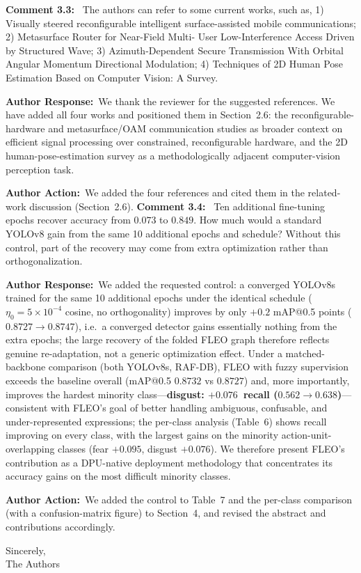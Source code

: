 \documentclass[11pt]{article}
\newcommand{\comment}[1]{\smallskip\noindent\textbf{\color{navy}Comment #1:}\ }
\newcommand{\response}{\smallskip\par\noindent\textbf{\color{steel}Author Response:}\ }
\newcommand{\action}{\smallskip\par\noindent\textbf{\color{steel}Author Action:}\ }
\begin{document}
\comment{3.3} The authors can refer to some current works, such as, 1) Visually steered reconfigurable
intelligent surface-assisted mobile communications; 2) Metasurface Router for Near-Field Multi-
User Low-Interference Access Driven by Structured Wave; 3) Azimuth-Dependent Secure
Transmission With Orbital Angular Momentum Directional Modulation; 4) Techniques of 2D
Human Pose Estimation Based on Computer Vision: A Survey.
\response We thank the reviewer for the suggested references. We have added all four works and
positioned them in Section~2.6: the reconfigurable-hardware and metasurface/OAM communication
studies as broader context on efficient signal processing over constrained, reconfigurable
hardware, and the 2D human-pose-estimation survey as a methodologically adjacent computer-vision
perception task.
\action We added the four references and cited them in the related-work discussion (Section~2.6).
\comment{3.4} Ten additional fine-tuning epochs recover accuracy from $0.073$ to $0.849$. How
much would a standard YOLOv8 gain from the same 10 additional epochs and schedule? Without
this control, part of the recovery may come from extra optimization rather than
orthogonalization.
\response We added the requested control: a converged YOLOv8s trained for the same 10
additional epochs under the identical schedule ($\eta_0=5\times10^{-4}$ cosine, no
orthogonality) improves by only $+0.2$ mAP@0.5 points ($0.8727\rightarrow0.8747$), i.e.\ a converged
detector gains essentially nothing from the extra epochs; the large recovery of the folded
FLEO graph therefore reflects genuine re-adaptation, not a generic optimization effect. Under
a matched-backbone comparison (both YOLOv8s, RAF-DB), FLEO with fuzzy supervision exceeds the
baseline overall (mAP@0.5 $0.8732$ vs $0.8727$) and, more importantly, improves the
hardest minority class---\textbf{disgust: $+0.076$~recall ($0.562\rightarrow0.638$)}---consistent
with FLEO's goal of better handling ambiguous, confusable, and under-represented expressions;
the per-class analysis (Table~6) shows recall improving on every class, with the largest gains
on the minority action-unit-overlapping classes (fear $+0.095$, disgust $+0.076$). We therefore
present FLEO's contribution as a DPU-native deployment methodology that concentrates its
accuracy gains on the most difficult minority classes.
\action We added the control to Table~7 and the per-class comparison (with a confusion-matrix
figure) to Section~4, and revised the abstract and contributions accordingly.

\bigskip
\noindent Sincerely,\\[2pt]
The Authors
\end{document}
